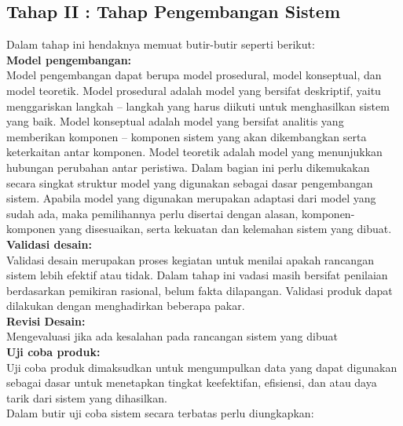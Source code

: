 \documentclass{jtetiproposalskripsi}
\begin{document}
\subsection{Tahap II : Tahap Pengembangan Sistem}
Dalam tahap ini  hendaknya memuat butir-butir seperti berikut:\\
\textbf{Model pengembangan:}\\
Model pengembangan dapat berupa model prosedural, model konseptual, dan model teoretik. Model prosedural adalah model yang bersifat deskriptif, yaitu menggariskan langkah – langkah yang harus diikuti untuk menghasilkan sistem yang baik. Model konseptual adalah model yang bersifat analitis yang memberikan komponen – komponen sistem yang akan dikembangkan serta keterkaitan antar komponen. Model teoretik adalah model yang menunjukkan hubungan perubahan antar peristiwa. Dalam bagian ini perlu  dikemukakan secara  singkat  struktur  model yang digunakan sebagai dasar pengembangan sistem. Apabila model yang digunakan merupakan adaptasi dari model yang sudah ada, maka pemilihannya perlu disertai dengan alasan, komponen-komponen yang disesuaikan, serta kekuatan dan kelemahan sistem yang dibuat.\\
\textbf{Validasi desain:}\\
Validasi desain merupakan proses kegiatan untuk menilai apakah rancangan sistem lebih efektif atau tidak. Dalam tahap ini vadasi masih bersifat penilaian berdasarkan pemikiran rasional, belum fakta dilapangan. Validasi produk dapat dilakukan dengan menghadirkan beberapa pakar.\\
\textbf{Revisi Desain:}\\
Mengevaluasi jika ada kesalahan pada rancangan sistem yang dibuat\\
\textbf{Uji coba produk:}\\
Uji coba produk dimaksudkan untuk mengumpulkan data yang dapat digunakan sebagai dasar untuk menetapkan tingkat keefektifan, efisiensi, dan atau daya tarik dari sistem yang dihasilkan.\\
Dalam butir uji coba sistem secara terbatas perlu diungkapkan:
\end{document}

